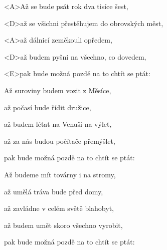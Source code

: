 

\zs
<A>Až se bude psát rok dva tisíce šest,

<D>až se všichni přestěhujem do obrovských měst,

<A>až dálnicí zeměkouli opředem,

<D>až budem pyšni na všechno, co dovedem,

<E>pak bude možná pozdě na to chtít se ptát:

\ks

\zs
Až suroviny budem vozit z Měsíce,

až počasí bude řídit družice,

až budem létat na Venuši na výlet,

až za nás budou počítače přemýšlet,

pak bude možná pozdě na to chtít se ptát:

\ks

\zs
Až budeme mít továrny i na stromy,

až umělá tráva bude před domy,

až zavládne v celém světě blahobyt,

až budem umět skoro všechno vyrobit,

pak bude možná pozdě na to chtít se ptát:

\ks

\kp






















